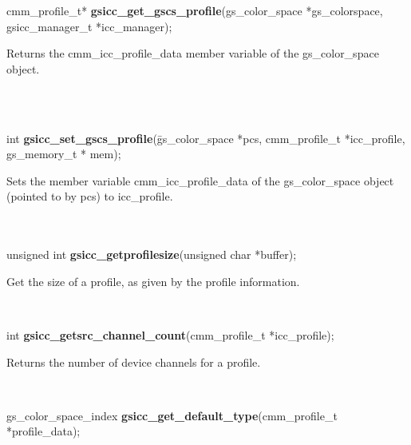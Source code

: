 \documentclass[12pt,notitlepage]{article}
\begin{document}
\begin{tabbing}
\noindent cmm\_profile\_t* {\bf gsicc\_get\_gscs\_profile}(gs\_color\_space *gs\_colorspace, gsicc\_manager\_t *icc\_manager);\\
\end{tabbing}

\begin{minipage}[h]{6.0in}
Returns the cmm\_icc\_profile\_data member variable of the gs\_color\_space object.
\end{minipage}\\
\\

\begin{tabbing}
\noindent int {\bf gsicc\_set\_gscs\_profile}(\=gs\_color\_space *pcs, cmm\_profile\_t *icc\_profile, \\
\> gs\_memory\_t * mem);\\
\end{tabbing}

\begin{minipage}[h]{6.0in}
Sets the member variable cmm\_icc\_profile\_data of the gs\_color\_space object (pointed to by pcs) to icc\_profile.
\end{minipage}\\
\\

\noindent unsigned int {\bf gsicc\_getprofilesize}(unsigned char *buffer);\\

\begin{minipage}[h]{6.0in}
Get the size of a profile, as given by the profile information.
\end{minipage}\\

\begin{tabbing}
\noindent int {\bf gsicc\_getsrc\_channel\_count}(cmm\_profile\_t *icc\_profile);\\
\end{tabbing}

\begin{minipage}[h]{6.0in}
Returns the number of device channels for a profile.
\end{minipage}\\

\begin{tabbing}
\noindent gs\_color\_space\_index {\bf gsicc\_get\_default\_type}(cmm\_profile\_t *profile\_data);\\
\end{tabbing}
\end{document}
